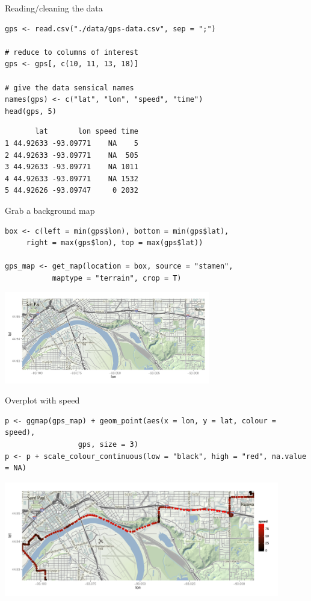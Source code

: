 \documentclass[sans,aspectratio=169,presentation,bigger,fleqn]{beamer}
\begin{document}
\begin{frame}[fragile,label=sec-25]{Reading/cleaning the data}
 \scriptsize
\begin{verbatim}
gps <- read.csv("./data/gps-data.csv", sep = ";")

# reduce to columns of interest
gps <- gps[, c(10, 11, 13, 18)]

# give the data sensical names
names(gps) <- c("lat", "lon", "speed", "time")
head(gps, 5)
\end{verbatim}

\begin{verbatim}
       lat       lon speed time
1 44.92633 -93.09771    NA    5
2 44.92633 -93.09771    NA  505
3 44.92633 -93.09771    NA 1011
4 44.92633 -93.09771    NA 1532
5 44.92626 -93.09747     0 2032
\end{verbatim}

\normalsize
\end{frame}
\begin{frame}[fragile,label=sec-26]{Grab a background map}
 \scriptsize

\begin{verbatim}
box <- c(left = min(gps$lon), bottom = min(gps$lat),
	 right = max(gps$lon), top = max(gps$lat))

gps_map <- get_map(location = box, source = "stamen",
		   maptype = "terrain", crop = T)
\end{verbatim}

\begin{center}
\includegraphics[height=4cm]{./img/gps-map.pdf}
\end{center}
\end{frame}
\begin{frame}[fragile,label=sec-27]{Overplot with speed}
 \scriptsize

\begin{verbatim}
p <- ggmap(gps_map) + geom_point(aes(x = lon, y = lat, colour = speed),
				 gps, size = 3)
p <- p + scale_colour_continuous(low = "black", high = "red", na.value = NA)
\end{verbatim}

\begin{center}
\includegraphics[height=5cm]{./img/gps-map-over.pdf}
\end{center}

\normalsize
\end{frame}
\end{document}
